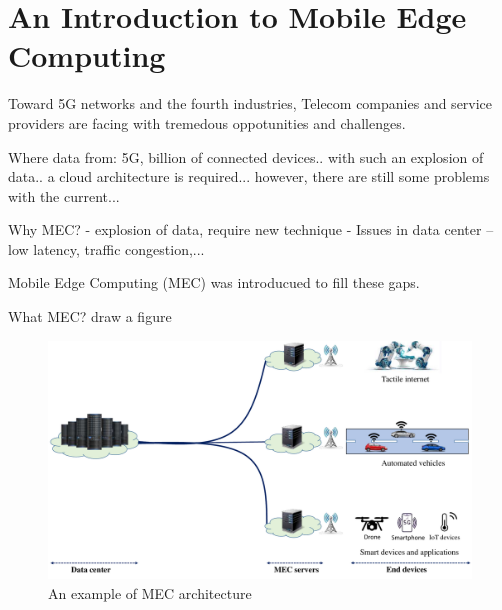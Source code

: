 \section{An Introduction to Mobile Edge Computing}  \label{intro}


Toward 5G networks and the fourth industries, Telecom companies and service providers are facing with tremedous oppotunities and challenges.


Where data from: 5G, billion of connected devices.. with  such an explosion of data.. a cloud architecture is required... however, there are still some problems with the current...


Why MEC? 
  - explosion of data, require new technique
  - Issues in data center -- low latency, traffic congestion,...

Mobile Edge Computing (MEC) was introducued to fill these gaps.

What MEC? draw a figure


\begin{figure}[H]
  \begin{center}
   \includegraphics[width=13cm]{./figures/mec-arch.pdf}
   \caption{An example of MEC architecture}
   \label{fig:mec-arch}
   \end{center}
\end{figure}
